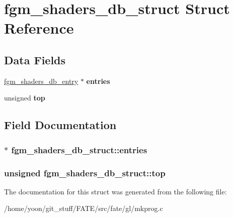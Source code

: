 \hypertarget{structfgm__shaders__db__struct}{\section{fgm\-\_\-shaders\-\_\-db\-\_\-struct Struct Reference}
\label{structfgm__shaders__db__struct}
}
\subsection*{Data Fields}
\begin{DoxyCompactItemize}
\item 
\hypertarget{structfgm__shaders__db__struct_ab19795d2c6db04b7818f1f7798ff23fd}{\hyperlink{structfgm__shaders__db__entry}{fgm\-\_\-shaders\-\_\-db\-\_\-entry} $\ast$ {\bfseries entries}}\label{structfgm__shaders__db__struct_ab19795d2c6db04b7818f1f7798ff23fd}

\item 
\hypertarget{structfgm__shaders__db__struct_af9e49af50fc7463a863d5986fb6be79b}{unsigned {\bfseries top}}\label{structfgm__shaders__db__struct_af9e49af50fc7463a863d5986fb6be79b}

\end{DoxyCompactItemize}


\subsection{Field Documentation}
\hypertarget{structfgm__shaders__db__struct_ab19795d2c6db04b7818f1f7798ff23fd}{
\subsubsection[{entries}]{$\ast$ fgm\-\_\-shaders\-\_\-db\-\_\-struct\-::entries}}\label{structfgm__shaders__db__struct_ab19795d2c6db04b7818f1f7798ff23fd}
\hypertarget{structfgm__shaders__db__struct_af9e49af50fc7463a863d5986fb6be79b}{
\subsubsection[{top}]{\setlength{\rightskip}{0pt plus 5cm}unsigned fgm\-\_\-shaders\-\_\-db\-\_\-struct\-::top}}\label{structfgm__shaders__db__struct_af9e49af50fc7463a863d5986fb6be79b}


The documentation for this struct was generated from the following file\-:\begin{DoxyCompactItemize}
\item 
/home/yoon/git\-\_\-stuff/\-F\-A\-T\-E/src/fate/gl/mkprog.\-c\end{DoxyCompactItemize}
